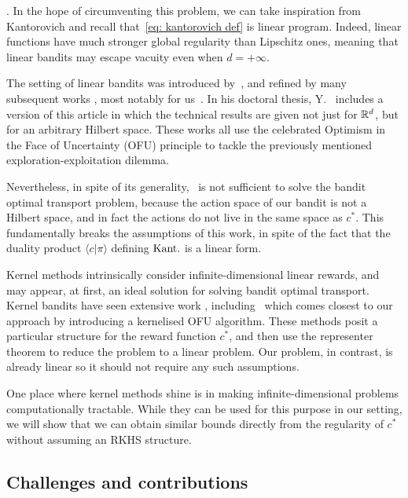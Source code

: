 . In the hope of circumventing this problem, we can take inspiration from Kantorovich and recall that~\eqref{eq: kantorovich def} is linear program. Indeed, linear functions have much stronger global regularity than Lipschitz ones, meaning that linear bandits may escape vacuity even when $d=+\infty$.   

The setting of linear bandits was introduced by~\cite{auer_using_2003}, and refined by many subsequent works \citep{abeille_linear_2017,vernade_linear_2020,hao_high-dimensional_2020}, most notably for us~\cite{abbasi-yadkori_improved_2011}. In his doctoral thesis, Y.~\cite{abbasi-yadkori_online_2012} includes a version of this article in which the technical results are given not just for $\mathbb{R}^d$, but for an arbitrary Hilbert space. These works all use the celebrated Optimism in the Face of Uncertainty (OFU) principle to tackle the previously mentioned exploration-exploitation dilemma.

Nevertheless, in spite of its generality,~\cite{abbasi-yadkori_online_2012} is not sufficient to solve the bandit optimal transport problem, because the action space of our bandit is not a Hilbert space, and in fact the actions do not live in the same space as $c^*$. This fundamentally breaks the assumptions of this work, in spite of the fact that the duality product $\langle c\vert \pi \rangle$ defining $\text{Kant.}$ is a linear form. 

 Kernel methods intrinsically consider infinite-dimensional linear rewards, and may appear, at first, an ideal solution for solving bandit optimal transport. Kernel bandits have seen extensive work \citep{chowdhury_kernelized_2017,janz_bandit_2020,takemori_approximation_2021},  including~\cite{valko_finite-time_2013} which comes closest to our approach by introducing a kernelised OFU algorithm. These methods posit a particular structure for the reward function $c^*$, and then use the representer theorem to reduce the problem to a linear problem. Our problem, in contrast, is already linear so it should not require any such assumptions. 

One place where kernel methods shine is in making infinite-dimensional problems computationally tractable. While they can be used for this purpose in our setting, we will show that we can obtain similar bounds directly from the regularity of $c^*$ without assuming an RKHS structure. 

  
\subsection{Challenges and contributions}

